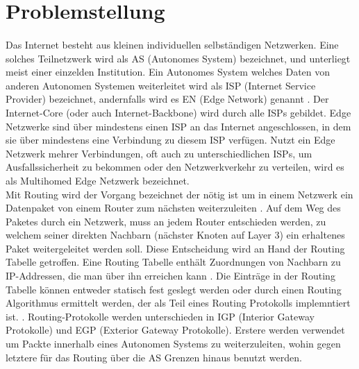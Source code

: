 \section{Problemstellung}


\paragraph{}
Das Internet besteht aus kleinen individuellen selbständigen Netzwerken. Eine solches Teilnetzwerk wird als AS (Autonomes System) bezeichnet, und unterliegt meist einer einzelden Institution. Ein Autonomes System welches Daten von anderen Autonomen Systemen weiterleitet wird als ISP (Internet Service Provider) bezeichnet, andernfalls wird es EN  (Edge Network) genannt \cite{Mahorta:2002:IR}. Der Internet-Core (oder auch Internet-Backbone) wird durch alle ISPs gebildet. Edge Netzwerke sind über mindestens einen ISP an das Internet angeschlossen, in dem sie über mindestens eine Verbindung zu diesem ISP verfügen. Nutzt ein Edge Netzwerk mehrer Verbindungen, oft auch zu unterschiedlichen ISPs, um Ausfallssicherheit zu bekommen oder den Netzwerkverkehr zu verteilen, wird es als Multihomed Edge Netzwerk bezeichnet. \\

Mit Routing wird der Vorgang bezeichnet der nötig ist um in einem Netzwerk ein Datenpaket von einem Router zum nächsten weiterzuleiten \cite{Mahorta:2002:IR}. Auf dem Weg des Paketes durch ein Netzwerk, muss an jedem Router entschieden werden, zu welchem seiner direkten Nachbarn (nächster Knoten auf Layer 3) ein erhaltenes Paket weitergeleitet werden soll. Diese Entscheidung wird an Hand der Routing Tabelle getroffen. Eine Routing Tabelle enthält Zuordnungen von Nachbarn zu IP-Addressen, die man über ihn erreichen kann \cite{Mahorta:2002:IR}. Die Einträge in der Routing Tabelle können entweder statisch fest geslegt werden oder durch einen Routing Algorithmus ermittelt werden, der als Teil eines Routing Protokolls implemntiert ist. \cite{Tanenbaum:2003:CN}. Routing-Protokolle werden unterschieden in IGP (Interior Gateway Protokolle) und EGP (Exterior Gateway Protokolle). Erstere werden verwendet um Packte innerhalb eines Autonomen Systems zu weiterzuleiten, wohin gegen letztere für das Routing über die AS Grenzen hinaus benutzt werden. \\


